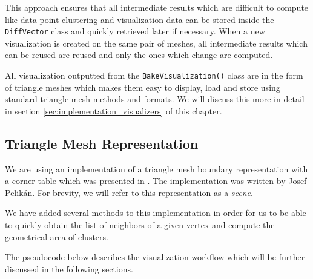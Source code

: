 This approach ensures that all intermediate results which are difficult to compute like data point clustering and visualization data can be stored inside the \verb+DiffVector+ class and quickly retrieved later if necessary. When a new visualization is created on the same pair of meshes, all intermediate results which can be reused are reused and only the ones which change are computed.

All visualization outputted from the \verb+BakeVisualization()+ class are in the form of triangle meshes which makes them easy to display, load and store using standard triangle mesh methods and formats. We will discuss this more in detail in section \ref{sec:implementation_visualizers} of this chapter.

\subsection{Triangle Mesh Representation}
\label{sec:mesh_representation}

We are using an implementation of a triangle mesh boundary representation with a corner table which was presented in \citet{Corner03}. The implementation was written by Josef Pelikán. For brevity, we will refer to this representation as a {\it scene}\footnotemark.


We have added several methods to this implementation in order for us to be able to quickly obtain the list of neighbors of a given vertex and compute the geometrical area of clusters.

The pseudocode below describes the visualization workflow which will be further discussed in the following sections.

